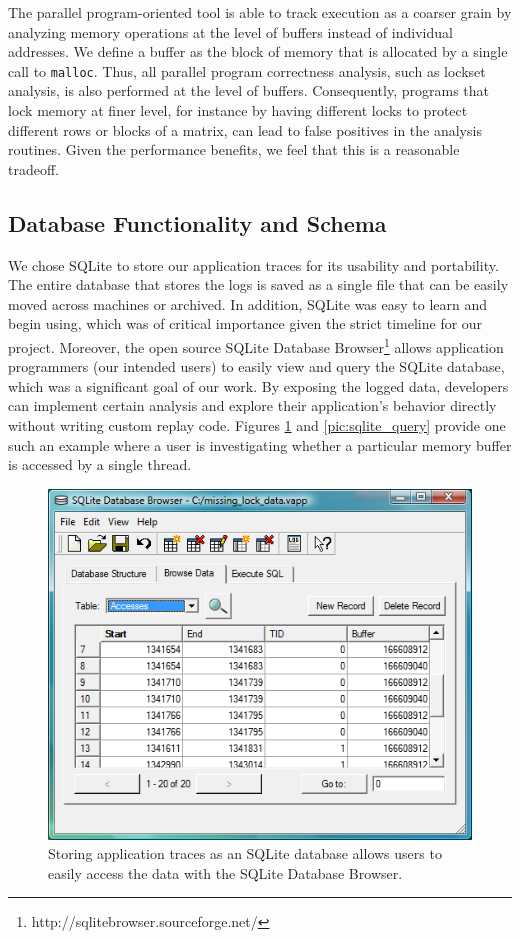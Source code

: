 The parallel program-oriented tool is able to track execution
as a coarser grain by analyzing memory operations at the level
of buffers instead of individual addresses.  We define a buffer
as the block of memory that is allocated by a single call to
\texttt{malloc}.  Thus, all parallel program correctness analysis,
such as lockset analysis, is also performed at the level of buffers.
Consequently, programs that lock memory at finer level, for instance
by having different locks to protect different rows or blocks of a matrix,
can lead to false positives in the analysis routines.
Given the performance benefits, we feel that this is a reasonable tradeoff.

\subsection{Database Functionality and Schema}
We chose SQLite to store our application traces for its usability
and portability.  The entire database that stores the logs is
saved as a single file that can be easily moved across machines
or archived.  In addition, SQLite was easy to learn and begin
using, which was of critical importance given the strict timeline
for our project.  Moreover, the open source
SQLite Database Browser\footnote{http://sqlitebrowser.sourceforge.net/}
allows application programmers (our intended users) to easily view
and query the SQLite database, which was a significant goal of our
work.  By exposing the logged data, developers can implement
certain analysis and explore their application's behavior directly
without writing custom replay code.  Figures \ref{pic:sqlite_browse}
and \ref{pic:sqlite_query}
provide one such an example where a user is investigating
whether a particular memory buffer is accessed by a single thread.


\begin{figure}
  \includegraphics[width=\columnwidth]{sqlite_browse}
  \caption{Storing application traces as an SQLite database
  	allows users to easily access the data with the SQLite
  	Database Browser.}
  \label{pic:sqlite_browse}
\end{figure}


